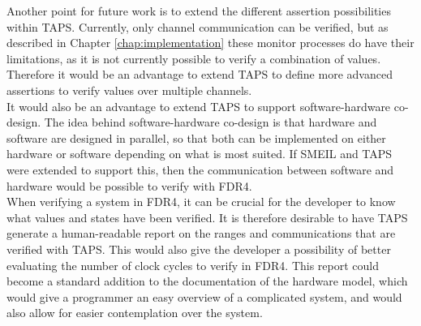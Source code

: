 Another point for future work is to extend the different assertion possibilities within TAPS. Currently, only channel communication can be verified, but as described in Chapter \ref{chap:implementation}
these monitor processes do have their limitations, as it is not currently possible to verify a combination of values. Therefore it would be an advantage to extend TAPS to define more advanced assertions to verify values over multiple channels. \\

It would also be an advantage to extend TAPS to support software-hardware co-design. The idea behind software-hardware co-design is that hardware and software are designed in parallel, so that both can be implemented on either hardware or software depending on what is most suited. If SMEIL and TAPS were extended to support this, then the communication between software and hardware would be possible to verify with FDR4. \\

When verifying a system in FDR4, it can be crucial for the developer to know what values and states have been verified. It is therefore desirable to have TAPS generate a human-readable report on the ranges and communications that are verified with TAPS. This would also give the developer a possibility of better evaluating the number of clock cycles to verify in FDR4.
This report could become a standard addition to the documentation of the hardware model, which would give a programmer an easy overview of a complicated system, and would also allow for easier contemplation over the system.